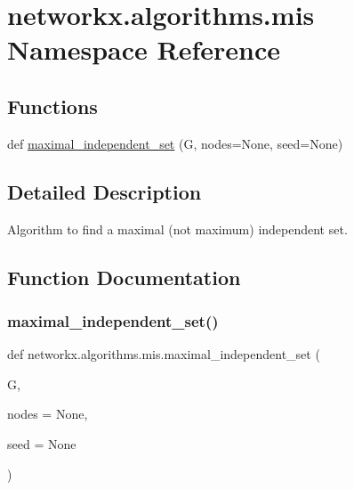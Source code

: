 \hypertarget{namespacenetworkx_1_1algorithms_1_1mis}{}\section{networkx.\+algorithms.\+mis Namespace Reference}
\label{namespacenetworkx_1_1algorithms_1_1mis}
\subsection*{Functions}
\begin{DoxyCompactItemize}
\item 
def \hyperlink{namespacenetworkx_1_1algorithms_1_1mis_adf60d61f598341fd0a205a534f8d8b36}{maximal\+\_\+independent\+\_\+set} (G, nodes=None, seed=None)
\end{DoxyCompactItemize}


\subsection{Detailed Description}
\begin{DoxyVerb}Algorithm to find a maximal (not maximum) independent set.\end{DoxyVerb}
 

\subsection{Function Documentation}
\mbox{\label{namespacenetworkx_1_1algorithms_1_1mis_adf60d61f598341fd0a205a534f8d8b36}} 
\subsubsection{\texorpdfstring{maximal\+\_\+independent\+\_\+set()}{maximal\_independent\_set()}}
{\footnotesize\ttfamily def networkx.\+algorithms.\+mis.\+maximal\+\_\+independent\+\_\+set (\begin{DoxyParamCaption}\item[{}]{G,  }\item[{}]{nodes = {\ttfamily None},  }\item[{}]{seed = {\ttfamily None} }\end{DoxyParamCaption})}

